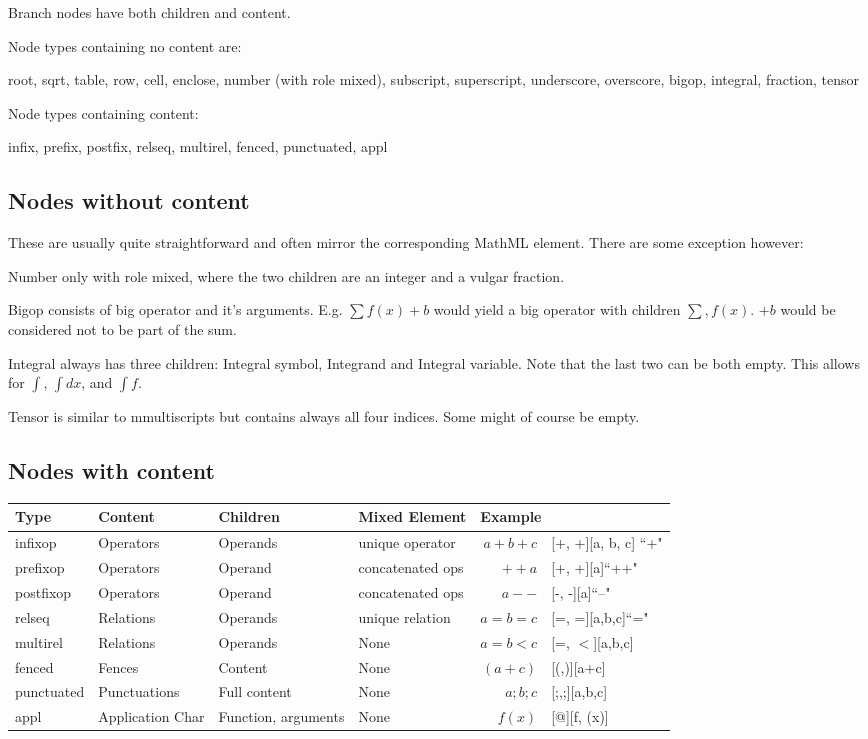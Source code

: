 \documentclass{article}
\begin{document}
Branch nodes have both children and content. 

Node types containing no content are: 

root, sqrt, table, row, cell, enclose, number (with role mixed), subscript,
superscript, underscore, overscore, bigop, integral, fraction, tensor

Node types containing content: 

infix, prefix, postfix, relseq, multirel, fenced, punctuated, appl

\subsection{Nodes without content}

These are usually quite straightforward and often mirror the corresponding
MathML element. There are some exception however: 

Number only with role mixed, where the two children are an integer and a vulgar
fraction.

Bigop consists of big operator and it's arguments. E.g. $\sum f(x) + b$ would
yield a big operator with children $\sum, f(x)$. $+ b$ would be considered not
to be part of the sum.

Integral always has three children: Integral symbol, Integrand and Integral
variable. Note that the last two can be both empty. This allows for $\int$,
$\int dx$, and $\int f$.

Tensor is similar to mmultiscripts but contains always all four indices.  Some
might of course be empty.

\subsection{Nodes with content}


\noindent
\begin{tabular}{l||l|l|l||r@{$\quad\longrightarrow\quad$}l}
  Type & Content & Children & Mixed Element & \multicolumn{2}{l}{Example}\\\hline
  infixop & Operators & Operands & unique operator & $a+b+c$ &  [+, +][a, b, c] ``+" \\
  prefixop & Operators & Operand & concatenated ops & $++a$ & [+, +][a]``++" \\ 
  postfixop & Operators & Operand & concatenated ops & $a--$ & [-, -][a]``--" \\ 
  relseq & Relations & Operands & unique relation & $a=b=c$ & [=, =][a,b,c]``=" \\ 
  multirel & Relations & Operands & None & $a=b<c$ & [=, $<$][a,b,c] \\ 
  fenced & Fences & Content & None & $(a + c)$ & [(,)][a+c]\\
  punctuated & Punctuations & Full content & None & $a;b;c$ & [;,;][a,b,c]\\
  appl & Application Char & Function, arguments & None & $f(x)$ & [@][f, (x)]\\
\end{tabular}
\end{document}

